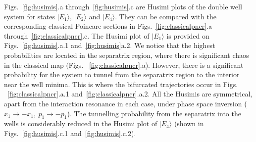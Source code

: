 \documentclass{article}
\begin{document}
Figs.~\ref{fig:husimis}.a through~\ref{fig:husimis}.c are Husimi plots of the double well system for states $|E_1\rangle$, $|E_2\rangle$ and $|E_4\rangle$. They can be compared with the corresponding classical Poincare sections in Figs.~\ref{fig:classicalpncr}.a through~\ref{fig:classicalpncr}.c. The Husimi plot of $|E_1\rangle$ is provided on Figs.~\ref{fig:husimis}.a.1 and~\ref{fig:husimis}a.2. We notice that the highest probabilities are located in the separatrix region, where there is significant chaos in the classical map (Figs. ~\ref{fig:classicalpncr}.a). However, there is a significant probability for the system to tunnel from the separatrix region to the interior near the well minima. This is where the bifurcated trajectories occur in Figs. ~\ref{fig:classicalpncr}.a.1 and~\ref{fig:classicalpncr}.a.2. All the Husimis are symmetrical, apart from the interaction resonance in each case, under phase space inversion ($x_1{\rightarrow}-x_1,~p_1{\rightarrow}-p_1$). 
The tunnelling probability from the separatrix into the wells is considerably reduced in the Husimi plot of $|E_4\rangle$ (shown in Figs.~\ref{fig:husimis}.c.1 and~\ref{fig:husimis}.c.2). 

%
%
\end{document}
